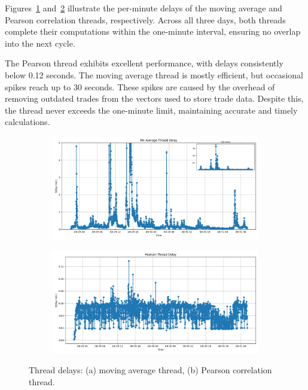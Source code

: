 \documentclass[11pt]{article}
\begin{document}
Figures~\ref{fig:mv-delay} and~\ref{fig:pearson-delay} illustrate the per-minute delays of the moving average and Pearson correlation threads, respectively. Across all three days, both threads complete their computations within the one-minute interval, ensuring no overlap into the next cycle.  

The Pearson thread exhibits excellent performance, with delays consistently below 0.12 seconds. The moving average thread is mostly efficient, but occasional spikes reach up to 30 seconds. These spikes are caused by the overhead of removing outdated trades from the vectors used to store trade data. Despite this, the thread never exceeds the one-minute limit, maintaining accurate and timely calculations.

\begin{figure}[h]
    \centering
    \begin{subfigure}{0.48\textwidth}
        \centering
        \includegraphics[width=\linewidth]{../assets/mv-average-thread-delay.png}
        \caption{}
        \label{fig:mv-delay}
    \end{subfigure}
    \hfill
    \begin{subfigure}{0.48\textwidth}
        \centering
        \includegraphics[width=\linewidth]{../assets/pearson-thread-delay.png}
        \caption{}
        \label{fig:pearson-delay}
    \end{subfigure}
    \caption{Thread delays: (a) moving average thread, (b) Pearson correlation thread.}
    \label{fig:thread-delays}
\end{figure}
\end{document}
